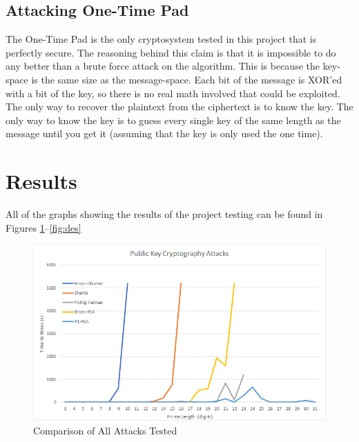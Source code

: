 \documentclass[12pt]{report}
\begin{document}
\subsection{Attacking One-Time Pad}
The One-Time Pad is the only cryptosystem tested in this project that is perfectly secure. The reasoning behind this claim is that it is impossible to do any better than a brute force attack on
the algorithm. This is because the key-space is the same size as the message-space. Each bit of the message is XOR'ed with a bit of the key, so there is no real math involved that could be
exploited. The only way to recover the plaintext from the ciphertext is to know the key. The only way to know the key is to guess every single key of the same length as the message until you get
it (assuming that the key is only used the one time).

\section{Results}
\label{results}

All of the graphs showing the results of the project testing can be found in Figures \ref{fig:allattack}--\ref{fig:des}

\begin{figure}[hp!] %
    \begin{center}
        \includegraphics[width=0.85\linewidth]{AllAttack.PNG}
        \caption{Comparison of All Attacks Tested}
        \label{fig:allattack}
    \end{center}
\end{figure}
\end{document}
